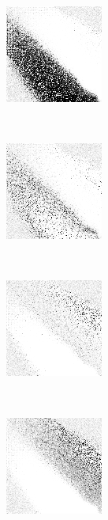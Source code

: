 
\begin{figure}
\center

	\begin{subfigure}[t]{0.22\textwidth}
		\includegraphics[width=\stratgraphwidth]{images/findings/round2/strats/random/hand_max_min.png}
		\caption{\handmaxmin}
	\end{subfigure}
	~
	\begin{subfigure}[t]{0.22\textwidth}
		\includegraphics[width=\stratgraphwidth]{images/findings/round2/strats/random/hand_max_avg.png}
		\caption{\handmaxavg}
	\end{subfigure}
	~
	\begin{subfigure}[t]{0.22\textwidth}
		\includegraphics[width=\stratgraphwidth]{images/findings/round2/strats/random/hand_max_med.png}
		\caption{\handmaxmed}
	\end{subfigure}
	~
	\begin{subfigure}[t]{0.22\textwidth}
		\includegraphics[width=\stratgraphwidth]{images/findings/round2/strats/random/hand_max_poss.png}
		\caption{\handmaxposs}
	\end{subfigure}


\end{figure}
